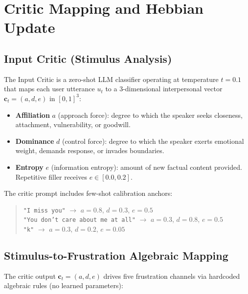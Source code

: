\appendix
\setcounter{table}{0}
\renewcommand{\thetable}{\Alph{section}\arabic{table}}
\setcounter{figure}{0}
\renewcommand{\thefigure}{\Alph{section}\arabic{figure}}

\section{Critic Mapping and Hebbian Update}
\label{app:critic}

\subsection{Input Critic (Stimulus Analysis)}

The Input Critic is a zero-shot LLM classifier operating at temperature $t = 0.1$ that maps each user utterance $u_t$ to a 3-dimensional interpersonal vector $\mathbf{c}_t = (a, d, e)$ in $[0,1]^3$:

\begin{itemize}
  \item \textbf{Affiliation} $a$ (approach force): degree to which the speaker seeks closeness, attachment, vulnerability, or goodwill.
  \item \textbf{Dominance} $d$ (control force): degree to which the speaker exerts emotional weight, demands response, or invades boundaries.
  \item \textbf{Entropy} $e$ (information entropy): amount of new factual content provided. Repetitive filler receives $e \in [0.0, 0.2]$.
\end{itemize}

\noindent The critic prompt includes few-shot calibration anchors:
\begin{quote}
\small
\texttt{"I miss you"} $\rightarrow$ $a = 0.8$, $d = 0.3$, $e = 0.5$ \\
\texttt{"You don't care about me at all"} $\rightarrow$ $a = 0.3$, $d = 0.8$, $e = 0.5$ \\
\texttt{"k"} $\rightarrow$ $a = 0.3$, $d = 0.2$, $e = 0.05$
\end{quote}

\subsection{Stimulus-to-Frustration Algebraic Mapping}

The critic output $\mathbf{c}_t = (a, d, e)$ drives five frustration channels via hardcoded algebraic rules (no learned parameters):

